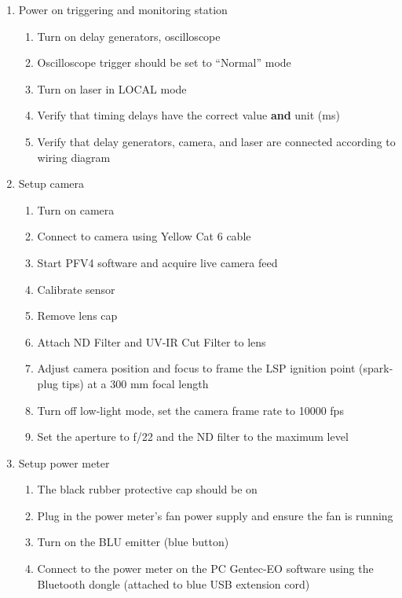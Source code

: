 \begin{enumerate}
\def\labelenumi{\arabic{enumi}.}

\item
  Power on triggering and monitoring station

  \begin{enumerate}
  \def\labelenumii{\arabic{enumii}.}
  
  \item
    Turn on delay generators, oscilloscope
  \item
    Oscilloscope trigger should be set to ``Normal'' mode
  \item
    Turn on laser in LOCAL mode
  \item
    Verify that timing delays have the correct value \textbf{and} unit
    (ms)
  \item
    Verify that delay generators, camera, and laser are connected
    according to wiring diagram
  \end{enumerate}
\item
  Setup camera

  \begin{enumerate}
  \def\labelenumii{\arabic{enumii}.}
  \item
    Turn on camera
  \item
    Connect to camera using Yellow Cat 6 cable
  \item
    Start PFV4 software and acquire live camera feed
  \item
    Calibrate sensor
  \item
    Remove lens cap
  \item
    Attach ND Filter and UV-IR Cut Filter to lens
  \item
    Adjust camera position and focus to frame the LSP ignition point
    (spark-plug tips) at a 300 mm focal length

  \item
    Turn off low-light mode, set the camera frame rate to 10000 fps
  \item
    Set the aperture to f/22 and the ND filter to the maximum level
  \end{enumerate}
\item
  Setup power meter

  \begin{enumerate}
  \def\labelenumii{\arabic{enumii}.}
  \item
    The black rubber protective cap should be on
  \item
    Plug in the power meter's fan power supply and ensure the fan is
    running
  \item
    Turn on the BLU emitter (blue button)
  \item
    Connect to the power meter on the PC Gentec-EO software using the
    Bluetooth dongle (attached to blue USB extension cord)


\end{enumerate}
\end{enumerate}
